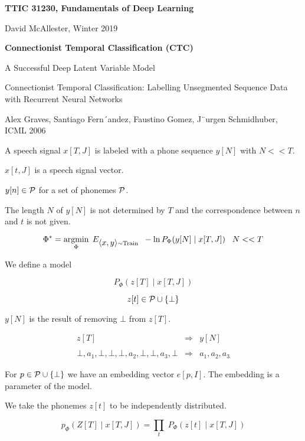 




{\Huge

  \centerline{\bf TTIC 31230, Fundamentals of Deep Learning}
  \bigskip
  \centerline{David McAllester, Winter 2019}
  \vfill
  \centerline{\bf Connectionist Temporal Classification (CTC)}
\vfill
\vfill
\vfill

{A Successful Deep Latent Variable Model}

Connectionist Temporal Classification: Labelling Unsegmented
Sequence Data with Recurrent Neural Networks

\vfill
Alex Graves, Santiago Fern´andez, Faustino Gomez, J¨urgen Schmidhuber, ICML 2006

A speech signal $x[T,J]$ is labeled with a phone sequence $y[N]$ with $N << T$.

\vfill
$x[t,J]$ is a speech signal vector.

\vfill
$y[n] \in {\cal P}$ for a set of phonemes ${\cal P}$.


\vfill
The length $N$ of $y[N]$ is not determined by $T$ and the correspondence between $n$ and $t$ is not given.

\vfill
{\color{red} $$\Phi^* = \operatorname*{argmin}_\Phi\;E_{{\mbox{$\langle x,y\rangle$}} \sim \mathrm{Train}}\;\;- \ln P_\Phi(y[N]\;|\;x[T,J]) \;\;\;N << T$$}




We define a model

$$P_\Phi(z[T]\;|\;x[T,J])$$

$$z[t] \in {\cal P} \cup \{\bot\}$$

\vfill
$y[N]$ is the result of removing $\bot$ from $z[T]$.

\begin{eqnarray*}
z[T] & \Rightarrow & y[N] \\
\\
\bot,a_1,\bot,\bot,\bot,a_2,\bot,\bot,a_3,\bot  & \Rightarrow & a_1,a_2,a_3
\end{eqnarray*}



For $p \in {\cal P} \cup \{\bot\}$ we have an embedding vector $e[p,I]$.  The embedding is a parameter of the model.

\vfill
We take the phonemes $z[t]$ to be independently distributed.

$$p_\Phi(Z[T]\;|\; x[T,J]) = \prod_t \;P_\Phi(z[t]\;|\;x[T,J])$$

}
